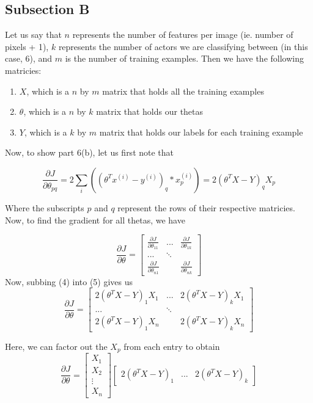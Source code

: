 \documentclass[11pt,a4paper]{report}
\begin{document}
\subsection*{Subsection B}
Let us say that $n$ represents the number of features per image (ie. number of pixels + 1), $k$ represents the number of actors we are classifying between (in this case, 6), and $m$ is the number of training examples. Then we have the following matricies:
\begin{enumerate}
\item $X$, which is a $n$ by $m$ matrix that holds all the training examples
\item $\theta$, which is a $n$ by $k$ matrix that holds our thetas
\item $Y$, which is a $k$ by $m$ matrix that holds our labels for each training example
\end{enumerate}
Now, to show part 6(b), let us first note that 

\begin{equation}
\frac{\partial J}{\partial \theta_{pq}} = 2 \sum_i((\theta^T x^{(i)} - y^{(i)})_q*x^{(i)}_p) = 2(\theta^TX-Y)_qX_p
\end{equation}

Where the subscripts $p$ and $q$ represent the rows of their respective matricies. \\

Now, to find the gradient for all thetas, we have

\begin{equation}
\frac{\partial J}{\partial \theta} = 
\begin{bmatrix}
\frac{\partial J}{\partial \theta_{11}} & ... & \frac{\partial J}{\partial \theta_{1k}}\\
... &  \ddots \\
\frac{\partial J}{\partial \theta_{n1}} & & \frac{\partial J}{\partial \theta_{nk}}
\end{bmatrix}
\end{equation}
Now, subbing (4) into (5) gives us
\begin{equation}
\frac{\partial J}{\partial \theta} = 
\begin{bmatrix}
2(\theta^TX-Y)_1X_1 & ... & 2(\theta^TX-Y)_kX_1\\
... &  \ddots \\
2(\theta^TX-Y)_1X_n & & 2(\theta^TX-Y)_kX_n
\end{bmatrix}
\end{equation}

Here, we can factor out the $X_p$ from each entry to obtain
\begin{equation}
\frac{\partial J}{\partial \theta} = 
\begin{bmatrix}
X_1 \\
X_2 \\
\vdots\\
X_n	
\end{bmatrix}
\begin{bmatrix}
2(\theta^TX-Y)_1 & ... & 2(\theta^TX-Y)_k
\end{bmatrix}
\end{equation}
\end{document}
